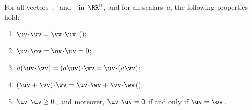 \begin{theorem} \label{thm:dotops}
For all vectors~\uv, \vv\ and~\wv\ in~\(\RR^n\), and for all scalars~\(a\), the following properties hold:
\begin{enumerate}
\item\label{thm:dotopsa} \(\uv\cdot\vv=\vv\cdot\uv\) \quad();
\item\label{thm:dotopsc} \(\uv\cdot\ov=\ov\cdot\uv=0\);
\item\label{thm:dotopse} \(a(\uv\cdot\vv)=(a\uv)\cdot\vv=\uv\cdot(a\vv)\);
\item\label{thm:dotopsf} \((\uv+\vv)\cdot\wv=\uv\cdot\wv+\vv\cdot\wv\)\quad();
\item\label{thm:dotopsg} \(\uv\cdot\uv\geq0\)\,, and moreover, \(\uv\cdot\uv=0\) if and only if \(\uv=\ov\)\,.
\end{enumerate}
\end{theorem}


